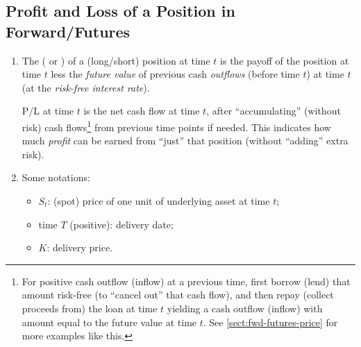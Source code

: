\subsection{Profit and Loss of a Position in Forward/Futures}
\begin{enumerate}
\item The  ( or ) of a (long/short)
position at time \(t\) is the payoff of the position at time \(t\) less the
\emph{future value} of previous cash \emph{outflows} (before time \(t\)) at
time \(t\) (at the \emph{risk-free interest rate}).
\begin{center}
\end{center}

\begin{note}
P/L at time \(t\) is the net cash flow at time \(t\), after ``accumulating''
(without risk) cash flows\footnote{For positive cash outflow (inflow) at a
previous time, first borrow (lend) that amount risk-free (to ``cancel out''
that cash flow), and then repay (collect proceeds from) the loan at time \(t\)
 yielding a cash outflow (inflow) with amount equal to the
future value at time \(t\). See \cref{sect:fwd-futures-price} for more examples
like this.} from previous time points if needed. This indicates how much
\emph{profit} can be earned from ``just'' that position (without ``adding''
extra risk).
\end{note}

\item \label{it:fwd-futures-notations}
Some notations:
\begin{itemize}
\item \(S_t\): (spot) price of one unit of underlying asset
 at time \(t\);
\item time \(T\) (positive): delivery date;
\item \(K\): delivery price.
\end{itemize}



\end{enumerate}
